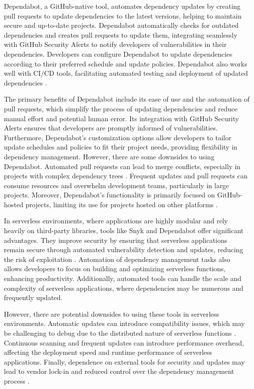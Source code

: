 \documentclass[sigconf]{acmart}
\begin{document}
Dependabot, a GitHub-native tool, automates dependency updates by creating pull requests to update dependencies to the latest versions, helping to maintain secure and up-to-date projects. Dependabot automatically checks for outdated dependencies and creates pull requests to update them, integrating seamlessly with GitHub Security Alerts to notify developers of vulnerabilities in their dependencies. Developers can configure Dependabot to update dependencies according to their preferred schedule and update policies. Dependabot also works well with CI/CD tools, facilitating automated testing and deployment of updated dependencies \cite{dependabot2023}.

The primary benefits of Dependabot include its ease of use and the automation of pull requests, which simplify the process of updating dependencies and reduce manual effort and potential human error. Its integration with GitHub Security Alerts ensures that developers are promptly informed of vulnerabilities. Furthermore, Dependabot's customization options allow developers to tailor update schedules and policies to fit their project needs, providing flexibility in dependency management. However, there are some downsides to using Dependabot. Automated pull requests can lead to merge conflicts, especially in projects with complex dependency trees \cite{dependabotMerge2023}. Frequent updates and pull requests can consume resources and overwhelm development teams, particularly in large projects. Moreover, Dependabot's functionality is primarily focused on GitHub-hosted projects, limiting its use for projects hosted on other platforms \cite{dependabotScope2023}.

In serverless environments, where applications are highly modular and rely heavily on third-party libraries, tools like Snyk and Dependabot offer significant advantages. They improve security by ensuring that serverless applications remain secure through automated vulnerability detection and updates, reducing the risk of exploitation \cite{serverlessSecurity2023}. Automation of dependency management tasks also allows developers to focus on building and optimizing serverless functions, enhancing productivity. Additionally, automated tools can handle the scale and complexity of serverless applications, where dependencies may be numerous and frequently updated.

However, there are potential downsides to using these tools in serverless environments. Automatic updates can introduce compatibility issues, which may be challenging to debug due to the distributed nature of serverless functions \cite{benischke2023updates}. Continuous scanning and frequent updates can introduce performance overhead, affecting the deployment speed and runtime performance of serverless applications. Finally, dependence on external tools for security and updates may lead to vendor lock-in and reduced control over the dependency management process \cite{kavis2014cloud}.
\end{document}
